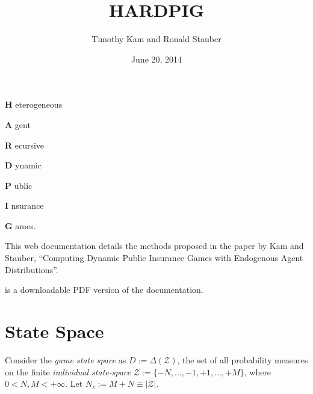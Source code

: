 \documentclass[a4paper,10pt,english]{sphinxmanual}
\title{HARDPIG}
\date{June 20, 2014}
\author{Timothy Kam and Ronald Stauber}
\begin{document}
\maketitle
\tableofcontents
{}\label{index::doc}


\begin{DUlineblock}{0em}
\item[] \textbf{H} eterogeneous
\item[]
\begin{DUlineblock}{\DUlineblockindent}
\item[] \textbf{A} gent
\end{DUlineblock}
\item[] \textbf{R} ecursive
\item[]
\begin{DUlineblock}{\DUlineblockindent}
\item[] \textbf{D} ynamic
\end{DUlineblock}
\item[] \textbf{P} ublic
\item[]
\begin{DUlineblock}{\DUlineblockindent}
\item[] \textbf{I} nsurance
\end{DUlineblock}
\item[] \textbf{G} ames.
\item[] 
\item[] 
\end{DUlineblock}

This web documentation details the methods proposed in the paper by Kam and
Stauber, ``Computing Dynamic Public Insurance Games with Endogenous Agent
Distributions''.

 is a downloadable PDF version of the documentation.


\chapter{State Space}
\label{statespace:introduction}\label{statespace:state-space}\label{statespace::doc}
Consider the \emph{game state space} as \(D := \Delta (\mathcal{Z})\), the set of
all probability measures on the finite \emph{individual state-space}
\(\mathcal{Z} := \{-N,...,-1,+1,...,+M\}\), where \(0<N,M <+\infty\).
Let \(N_{z}:=M+N \equiv |\mathcal{Z}|\).
\end{document}
